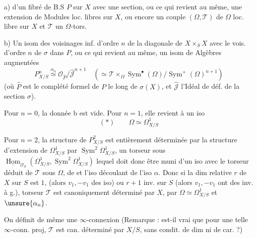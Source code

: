  a) d'un fibré de B.S $P$ sur $X$ avec une section, ou ce qui revient au même, une extension
de Modules loc. libres sur $X$, ou encore un couple $(\Omega,\mathcal{T})$ de $\Omega$ loc. libre sur $X$ et $\mathcal{T}$ un $\Omega$-tors.

 b) Un isom des voisinages inf. d'ordre $n$ de la diagonale de $X\times_S X$ avec le vois. d'ordre $n$ de $\sigma$ dans $P$, ou ce qui revient au même, un isom de Algèbres augmentées
\[
P^n_{X/S}\overset{\alpha_n}{\simeq}\mathcal{O}_{\widehat P}/\widehat{\mathcal{J}}^{n+1}
\quad(\simeq\mathcal{T}\times_{\Omega}\operatorname{Sym}^{\bullet}(\Omega)/\operatorname{Sym}^{+}(\Omega)^{n+1})
\]
(où $\widehat P$ est le complété formel de $P$ le long de $\sigma(X)$, et $\widehat{\mathcal{J}}$ l'Idéal de déf. de la section $\sigma$).

Pour $n=0$, la donnée b est vide. Pour $n=1$, elle revient à un iso
\[
(*)\qquad\Omega\simeq\Omega^1_{X/S}
\]

Pour $n=2$, la structure de $P^2_{X/S}$ est entièrement déterminée par la structure d'extension de $\Omega^1_{X/S}$ par $\operatorname{Sym}^2\Omega^1_{X/S}$,    un torseur sous $\underline{\operatorname{Hom}}_{\mathcal{O}_S}(\Omega^1_{X/S},\operatorname{Sym}^2\Omega^1_{X/S})$ lequel doit donc être muni d'un iso avec le torseur déduit de $\mathcal{T}$ sous $\Omega$, de
et l'iso découlant de l'iso $\alpha$. Donc si la dim relative
$r$ de $X$ sur $S$ est $1$,  (alors $v_1,-v_1$ des iso) ou $r+1$ inv. sur $S$ (alors $v_1,-v_1$ ont des inv. à g.),  torseur $\mathcal{T}$ est canoniquement déterminé par $X$, par $\Omega\simeq\Omega^1_{X/S}$ et $\unsure{\alpha_n}$.

On définit de même une $\infty$-connexion  (Remarque : est-il vrai que pour une telle $\infty$-conn. proj, $\mathcal{T}$ est can. déterminé par $X/S$, sans condit. de dim ni de car. ?)

